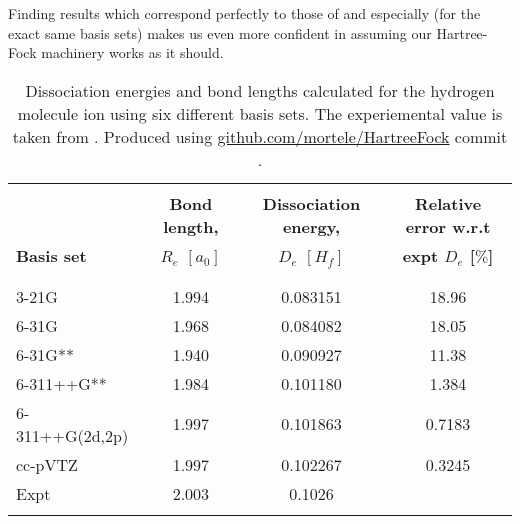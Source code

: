 \documentclass[../../master.tex]{subfiles}
\begin{document}
Finding results which correspond perfectly to those of \cite{szabo} and especially \cite{dragly} (for the exact same basis sets) makes us even more confident in assuming our Hartree-Fock machinery works as it should. 









\begin{table}
\setlength\extrarowheight{2pt}
\begin{tabularx}{\textwidth}{X *{3}{S[table-format=-1.3,table-space-text-post=***]}}
\hline
\hline
\\[-0.9em]
& \textbf{Bond length,}& \textbf{Dissociation energy,} & \textbf{Relative error w.r.t} 
\\
\textbf{Basis set} & \textbf{\phantom{----.}$R_e$ $[a_0]$} & \textbf{\phantom{---------.}$D_e$ $[H_f]$} & \textbf{\phantom{------}expt $D_e$ [$\%$]} 
\\
\\[-0.9em]
\hline
\\[-0.9em]
3-21G           & 1.994 & 0.083151 & 18.96        \\
6-31G           & 1.968 & 0.084082 & 18.05        \\
6-31G**         & 1.940 & 0.090927 & 11.38        \\
6-311++G**      & 1.984 & 0.101180 & 1.384        \\
6-311++G(2d,2p) & 1.997 & 0.101863 & 0.7183       \\
cc-pVTZ         & 1.997 & 0.102267 & 0.3245       \\
Expt            & 2.003 & 0.1026   &              \\ 
\\[-0.9em]
\hline
\end{tabularx}
\caption{Dissociation energies and bond lengths calculated for the hydrogen molecule ion  using six different basis sets. The experiemental value is taken from  \cite{langhoff}. Produced using \url{github.com/mortele/HartreeFock} commit . \label{tab:hfv4}}
\end{table}
\end{document}
